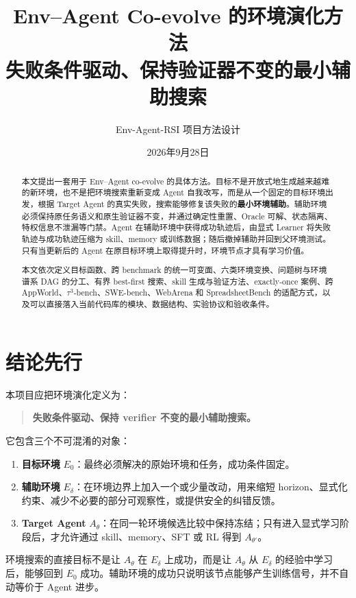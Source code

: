 \documentclass[11pt,a4paper,fontset=fandol]{ctexart}
\title{Env--Agent Co-evolve 的环境演化方法\\
\large 失败条件驱动、保持验证器不变的最小辅助搜索}
\author{Env-Agent-RSI 项目方法设计}
\date{2026年9月28日}
\newcommand{\Etarget}{E_0}
\newcommand{\Echild}{E_{\delta}}
\newcommand{\Agent}{A_{\theta}}
\newcommand{\Agentnew}{A_{\theta'}}
\begin{document}
\maketitle

\begin{abstract}
本文提出一套用于 Env--Agent co-evolve 的具体方法。目标不是开放式地生成越来越难的新环境，也不是把环境搜索重新变成 Agent 自我改写，而是从一个固定的目标环境出发，根据 Target Agent 的真实失败，搜索能够修复该失败的\textbf{最小环境辅助}。辅助环境必须保持原任务语义和原生验证器不变，并通过确定性重置、Oracle 可解、状态隔离、特权信息不泄漏等门禁。Agent 在辅助环境中获得成功轨迹后，由显式 Learner 将失败轨迹与成功轨迹压缩为 skill、memory 或训练数据；随后撤掉辅助并回到父环境测试。只有当更新后的 Agent 在原目标环境上取得提升时，环境节点才具有学习价值。

本文依次定义目标函数、跨 benchmark 的统一可变面、六类环境变换、问题树与环境谱系 DAG 的分工、有界 best-first 搜索、skill 生成与验证方法、exactly-once 案例、跨 AppWorld、$\tau^3$-bench、SWE-bench、WebArena 和 SpreadsheetBench 的适配方式，以及可以直接落入当前代码库的模块、数据结构、实验协议和验收条件。
\end{abstract}

\tableofcontents
\newpage

\section{结论先行}

本项目应把环境演化定义为：

\begin{quote}
\textbf{失败条件驱动、保持 verifier 不变的最小辅助搜索。}
\end{quote}

它包含三个不可混淆的对象：

\begin{enumerate}
  \item \textbf{目标环境} $\Etarget$：最终必须解决的原始环境和任务，成功条件固定。
  \item \textbf{辅助环境} $\Echild$：在环境边界上加入一个或少量改动，用来缩短 horizon、显式化约束、减少不必要的部分可观察性，或提供安全的纠错反馈。
  \item \textbf{Target Agent} $\Agent$：在同一轮环境候选比较中保持冻结；只有进入显式学习阶段后，才允许通过 skill、memory、SFT 或 RL 得到 $\Agentnew$。
\end{enumerate}

环境搜索的直接目标不是让 $\Agent$ 在 $\Echild$ 上成功，而是让 $\Agent$ 从 $\Echild$ 的经验中学习后，能够回到 $\Etarget$ 成功。辅助环境的成功只说明该节点能够产生训练信号，并不自动等价于 Agent 进步。
\end{document}

